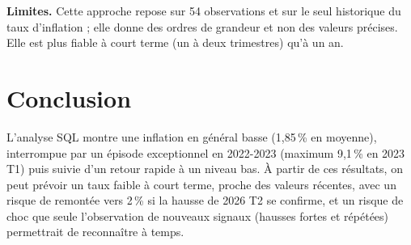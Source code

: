 \documentclass[11pt,a4paper]{article}
\begin{document}
\textbf{Limites.} Cette approche repose sur 54 observations et sur le seul historique du taux d'inflation ; elle donne des ordres de grandeur et non des valeurs précises. Elle est plus fiable à court terme (un à deux trimestres) qu'à un an.

\section{Conclusion}
L'analyse SQL montre une inflation en général basse (1,85\,\% en moyenne), interrompue par un épisode exceptionnel en 2022-2023 (maximum 9,1\,\% en 2023 T1) puis suivie d'un retour rapide à un niveau bas. À partir de ces résultats, on peut prévoir un taux faible à court terme, proche des valeurs récentes, avec un risque de remontée vers 2\,\% si la hausse de 2026 T2 se confirme, et un risque de choc que seule l'observation de nouveaux signaux (hausses fortes et répétées) permettrait de reconnaître à temps.
\end{document}
